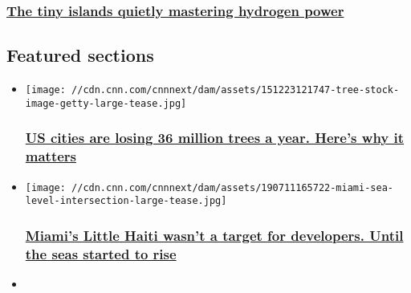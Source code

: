 \begin{itemize}
{  \subsubsection{\texorpdfstring{\href{/videos/business/2020/03/06/orkney-hydrogen-energy-lon-orig.cnn-business}{The
  tiny islands quietly mastering hydrogen
  power}}{The tiny islands quietly mastering hydrogen power}}\label{the-tiny-islands-quietly-mastering-hydrogen-power}}
\end{itemize}

\hypertarget{featured-sections-}{%
\subsection{Featured sections~}\label{featured-sections-}}

\begin{itemize}
\item
  \href{/2019/07/20/health/iyw-cities-losing-36-million-trees-how-to-help-trnd/index.html}{}

  \texttt{[image: //cdn.cnn.com/cnnnext/dam/assets/151223121747-tree-stock-image-getty-large-tease.jpg]}

  \hypertarget{us-cities-are-losing-36-million-trees-a-year-heres-why-it-matters-}{%
  \subsubsection{\texorpdfstring{\href{/2019/07/20/health/iyw-cities-losing-36-million-trees-how-to-help-trnd/index.html}{US
  cities are losing 36 million trees a year. Here's why it matters
  }}{US cities are losing 36 million trees a year. Here's why it matters }}\label{us-cities-are-losing-36-million-trees-a-year-heres-why-it-matters-}}
\item
  \href{/2019/07/11/us/miami-little-haiti-climate-gentrification-weir-wxc/index.html}{}

  \texttt{[image: //cdn.cnn.com/cnnnext/dam/assets/190711165722-miami-sea-level-intersection-large-tease.jpg]}

  \hypertarget{miamis-little-haiti-wasnt-a-target-for-developers-until-the-seas-started-to-rise}{%
  \subsubsection{\texorpdfstring{\href{/2019/07/11/us/miami-little-haiti-climate-gentrification-weir-wxc/index.html}{Miami's
  Little Haiti wasn't a target for developers. Until the seas started to
  rise}}{Miami's Little Haiti wasn't a target for developers. Until the seas started to rise}}\label{miamis-little-haiti-wasnt-a-target-for-developers-until-the-seas-started-to-rise}}
\item
  \href{/2019/07/12/health/rich-people-climate-change-intl/index.html}{}


\end{itemize}
